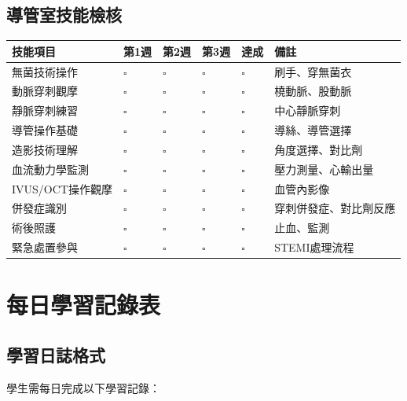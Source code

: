 \documentclass[12pt,a4paper]{article}
\begin{document}
\subsection{導管室技能檢核}

\begin{longtable}{|>{\raggedright\arraybackslash}p{3.5cm}|>{\raggedright\arraybackslash}p{1.5cm}|>{\raggedright\arraybackslash}p{1.5cm}|>{\raggedright\arraybackslash}p{1.5cm}|>{\raggedright\arraybackslash}p{1.5cm}|>{\raggedright\arraybackslash}p{4cm}|}
\hline
\rowcolor{light_green}
\textbf{技能項目} & \textbf{第1週} & \textbf{第2週} & \textbf{第3週} & \textbf{達成} & \textbf{備註} \\
\hline
無菌技術操作 & $\square$ & $\square$ & $\square$ & $\square$ & 刷手、穿無菌衣 \\
\hline
動脈穿刺觀摩 & $\square$ & $\square$ & $\square$ & $\square$ & 橈動脈、股動脈 \\
\hline
靜脈穿刺練習 & $\square$ & $\square$ & $\square$ & $\square$ & 中心靜脈穿刺 \\
\hline
導管操作基礎 & $\square$ & $\square$ & $\square$ & $\square$ & 導絲、導管選擇 \\
\hline
造影技術理解 & $\square$ & $\square$ & $\square$ & $\square$ & 角度選擇、對比劑 \\
\hline
血流動力學監測 & $\square$ & $\square$ & $\square$ & $\square$ & 壓力測量、心輸出量 \\
\hline
IVUS/OCT操作觀摩 & $\square$ & $\square$ & $\square$ & $\square$ & 血管內影像 \\
\hline
併發症識別 & $\square$ & $\square$ & $\square$ & $\square$ & 穿刺併發症、對比劑反應 \\
\hline
術後照護 & $\square$ & $\square$ & $\square$ & $\square$ & 止血、監測 \\
\hline
緊急處置參與 & $\square$ & $\square$ & $\square$ & $\square$ & STEMI處理流程 \\
\hline
\end{longtable}

\section{每日學習記錄表}

\subsection{學習日誌格式}
學生需每日完成以下學習記錄：
\end{document}

